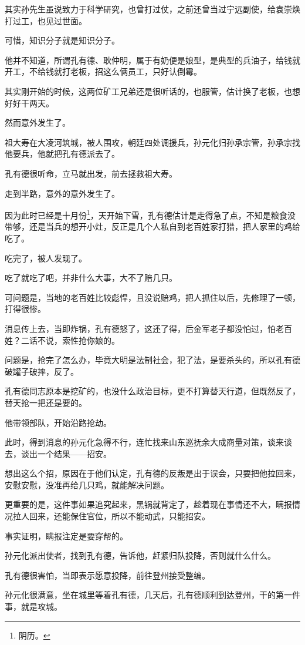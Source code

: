 \begin{multicols}{\theparacolNo}
其实孙先生虽说致力于科学研究，也曾打过仗，之前还曾当过宁远副使，给袁崇焕打过工，也见过世面。

可惜，知识分子就是知识分子。

他并不知道，所谓孔有德、耿仲明，属于有奶便是娘型，是典型的兵油子，给钱就开工，不给钱就打老板，招这么俩员工，只好认倒霉。

其实刚开始的时候，这两位矿工兄弟还是很听话的，也服管，估计换了老板，也想好好干两天。

然而意外发生了。

祖大寿在大凌河筑城，被人围攻，朝廷四处调援兵，孙元化归孙承宗管，孙承宗找他要兵，他就把孔有德派去了。

孔有德很听命，立马就出发，前去拯救祖大寿。

走到半路，意外的意外发生了。

因为此时已经是十月份\footnote{阴历。}，天开始下雪，孔有德估计是走得急了点，不知是粮食没带够，还是当兵的想开小灶，反正是几个人私自到老百姓家打猎，把人家里的鸡给吃了。

吃完了，被人发现了。

吃了就吃了吧，并非什么大事，大不了赔几只。

可问题是，当地的老百姓比较彪悍，且没说赔鸡，把人抓住以后，先修理了一顿，打得很惨。

消息传上去，当即炸锅，孔有德怒了，这还了得，后金军老子都没怕过，怕老百姓？二话不说，索性抢你娘的。

问题是，抢完了怎么办，毕竟大明是法制社会，犯了法，是要杀头的，所以孔有德破罐子破摔，反了。

孔有德同志原本是挖矿的，也没什么政治目标，更不打算替天行道，但既然反了，替天抢一把还是要的。

他带领部队，开始沿路抢劫。

此时，得到消息的孙元化急得不行，连忙找来山东巡抚余大成商量对策，谈来谈去，谈出一个结果——招安。

想出这么个招，原因在于他们认定，孔有德的反叛是出于误会，只要把他拉回来，安慰安慰，没准再给几只鸡，就能解决问题。

更重要的是，这件事如果追究起来，黑锅就背定了，趁着现在事情还不大，瞒报情况拉人回来，还能保住官位，所以不能动武，只能招安。

事实证明，瞒报注定是要穿帮的。

孙元化派出使者，找到孔有德，告诉他，赶紧归队投降，否则就什么什么。

孔有德很害怕，当即表示愿意投降，前往登州接受整编。

孙元化很满意，坐在城里等着孔有德，几天后，孔有德顺利到达登州，干的第一件事，就是攻城。


\end{multicols}
